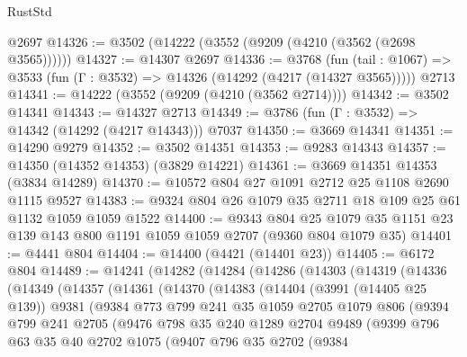 \begin{lexlean}{RustStd}
\begin{coremodule}
    @2697
@14326 := @3502 (@14222 (@3552 (@9209 (@4210 (@3562 (@2698 @3565))))))
@14327 := @14307 @2697
@14336 := @3768
    (fun (tail : @1067) => @3533 (fun (Γ : @3532) => @14326 (@14292 (@4217 (@14327 @3565)))))
    @2713
@14341 := @14222 (@3552 (@9209 (@4210 (@3562 @2714))))
@14342 := @3502 @14341
@14343 := @14327 @2713
@14349 := @3786 (fun (Γ : @3532) => @14342 (@14292 (@4217 @14343))) @7037
@14350 := @3669 @14341
@14351 := @14290 @9279
@14352 := @3502 @14351
@14353 := @9283 @14343
@14357 := @14350 (@14352 @14353) (@3829 @14221)
@14361 := @3669 @14351 @14353 (@3834 @14289)
@14370 := @10572 @804 @27 @1091 @2712 @25 @1108 @2690 @1115 @9527
@14383 := @9324 @804 @26 @1079 @35 @2711 @18 @109 @25 @61 @1132 @1059 @1059 @1522
@14400 := @9343
    @804
    @25
    @1079
    @35
    @1151
    @23
    @139
    @143
    @800
    @1191
    @1059
    @1059
    @2707
    (@9360 @804 @1079 @35)
@14401 := @4441 @804
@14404 := @14400 (@4421 (@14401 @23))
@14405 := @6172 @804
@14489 := @14241
    (@14282
      (@14284
        (@14286
          (@14303
            (@14319
              (@14336
                (@14349
                  (@14357
                    (@14361
                      (@14370
                        (@14383
                          (@14404
                            (@3991 (@14405 @25 @139))
                            @9381
                            (@9384
                              @773
                              @799
                              @241
                              @35
                              @1059
                              @2705
                              @1079
                              @806
                              (@9394
                                @799
                                @241
                                @2705
                                (@9476
                                  @798
                                  @35
                                  @240
                                  @1289
                                  @2704
                                  @9489
                                  (@9399
                                    @796
                                    @63
                                    @35
                                    @40
                                    @2702
                                    @1075
                                    (@9407
                                      @796
                                      @35
                                      @2702
                                      (@9384

\end{coremodule}
\end{lexlean}
